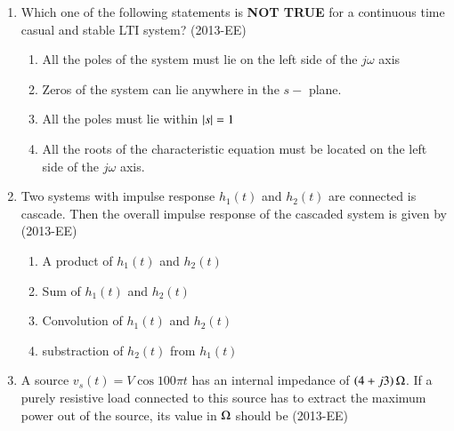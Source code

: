\documentclass[journal]{IEEEtran}
\begin{document}
\begin{enumerate}
\begin{enumerate}
    \end{enumerate}
    \item Which one of the following statements is \textbf{NOT TRUE} for a continuous time casual and stable LTI system? \hfill(2013-EE)
    \begin{enumerate}
        \item All the poles of the system must lie on the left side of the $j\omega$ axis
        \item Zeros of the system can lie anywhere in the $s-$ plane.
        \item All the poles must lie within $\left\vert s\right\vert = 1$
        \item All the roots of the characteristic equation must be located on the left side of the $j\omega$ axis.
    \end{enumerate}
    \item Two systems with impulse response $h_1(t)$ and $h_2(t)$ are connected is cascade. Then the overall impulse response of the cascaded system is given by \hfill(2013-EE)
    \begin{enumerate}
        \item A product of $h_1(t)$ and $h_2(t)$
        \item Sum of $h_1(t)$ and $h_{2}(t)$
        \item Convolution of $h_1(t)$ and $h_2(t)$
        \item substraction of $h_2(t)$ from $h_1(t)$
    \end{enumerate}
    \item A source $v_s(t) = V\cos{100\pi t}$ has an internal impedance of $\left(4 + j3\right) \ohm$. If a purely resistive load connected to this source has to extract the maximum power out of the source, its value in $\ohm$ should be \hfill(2013-EE)
    \begin{enumerate}
    \end{enumerate}

\end{enumerate}
\end{document}
